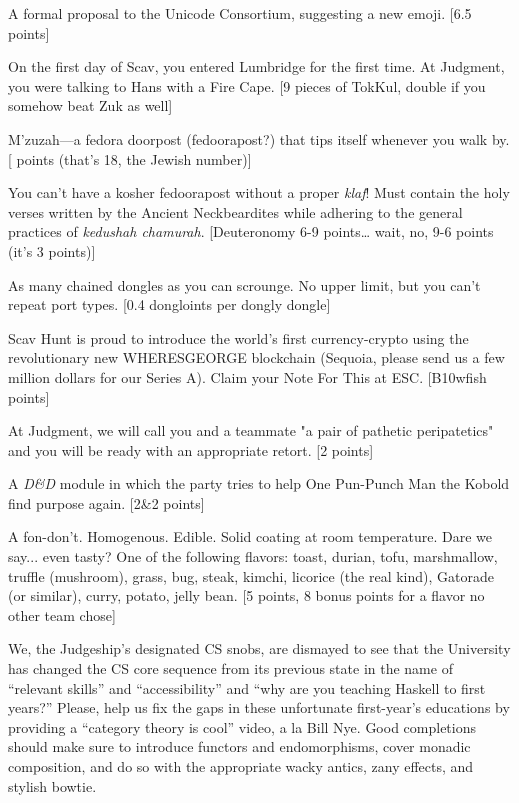 \documentclass{book}
\begin{document}
\begin{list}{}{}
\newpage
\item A formal proposal to the Unicode Consortium, suggesting a new emoji. [6.5 points] \textleaf
\item On the first day of Scav, you entered Lumbridge for the first time. At Judgment, you were talking to Hans with a Fire Cape. [9 pieces of TokKul, double if you somehow beat Zuk as well]
\item M’zuzah---a fedora doorpost (fedoorapost?) that tips itself whenever you walk by. [ points (that's 18, the Jewish number)]
\item You can’t have a kosher fedoorapost without a proper \textit{klaf}! Must contain the holy verses written by the Ancient Neckbeardites while adhering to the general practices of \textit{kedushah chamurah}. [Deuteronomy 6-9 points… wait, no, 9-6 points (it's 3 points)]
\item As many chained dongles as you can scrounge. No upper limit, but you can’t repeat port types. [0.4 dongloints per dongly dongle]
\item Scav Hunt is proud to introduce the world's first currency-crypto using the revolutionary new \linebreak WHERESGEORGE blockchain (Sequoia, please send us a few million dollars for our Series A). Claim your Note For This at ESC. [B10wfish points]
\item At Judgment, we will call you and a teammate "a pair of pathetic peripatetics" and you will be ready with an appropriate retort. [2 points]
\item A \textit{D\&D} module in which the party tries to help One Pun-Punch Man the Kobold find purpose again. [2\&2 points]
\item A fon-don’t. Homogenous. Edible. Solid coating at room temperature. Dare we say... even tasty? One of the following flavors: toast, durian, tofu, marshmallow, truffle (mushroom), grass, bug, steak, kimchi, licorice (the real kind), Gatorade (or similar), curry, potato, jelly bean. [5 points, 8 bonus points for a flavor no other team chose]
\item We, the Judgeship’s designated CS snobs, are dismayed to see that the University has changed the CS core sequence from its previous state in the name of “relevant skills” and “accessibility” and “why are you teaching Haskell to first years?” Please, help us fix the gaps in these unfortunate first-year’s educations by providing a “category theory is cool” video, a la Bill Nye. Good completions should make sure to introduce functors and endomorphisms, cover monadic composition, and do so with the appropriate wacky antics, zany effects, and stylish bowtie.



\end{list}
\end{document}
